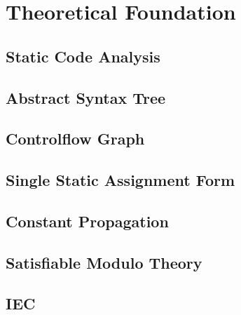 \chapter {Theoretical Foundation}
\label {cha:theoretical foundation}

\section{Static Code Analysis}
\section{Abstract Syntax Tree}
\section{Controlflow Graph}
\section{Single Static Assignment Form}
\section{Constant Propagation}
\section{Satisfiable Modulo Theory}
\section{IEC}
